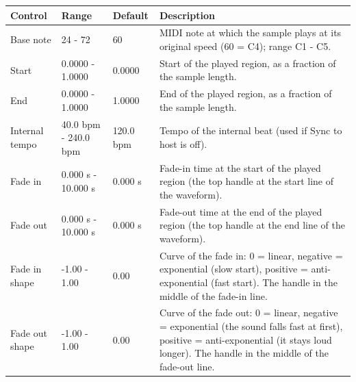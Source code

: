 \begin{tabular}{p{}p{}p{}p{}}
\hline
Control & Range & Default & Description \\
\hline
Base note & 24 - 72 & 60 & MIDI note at which the sample plays at its original speed (60 = C4); range C1 - C5. \\
Start & 0.0000 - 1.0000 & 0.0000 & Start of the played region, as a fraction of the sample length. \\
End & 0.0000 - 1.0000 & 1.0000 & End of the played region, as a fraction of the sample length. \\
Internal tempo & 40.0 bpm - 240.0 bpm & 120.0 bpm & Tempo of the internal beat (used if Sync to host is off). \\
Fade in & 0.000 s - 10.000 s & 0.000 s & Fade-in time at the start of the played region (the top handle at the start line of the waveform). \\
Fade out & 0.000 s - 10.000 s & 0.000 s & Fade-out time at the end of the played region (the top handle at the end line of the waveform). \\
Fade in shape & -1.00 - 1.00 & 0.00 & Curve of the fade in: 0 = linear, negative = exponential (slow start), positive = anti-exponential (fast start). The handle in the middle of the fade-in line. \\
Fade out shape & -1.00 - 1.00 & 0.00 & Curve of the fade out: 0 = linear, negative = exponential (the sound falls fast at first), positive = anti-exponential (it stays loud longer). The handle in the middle of the fade-out line. \\
\hline
\end{tabular}
